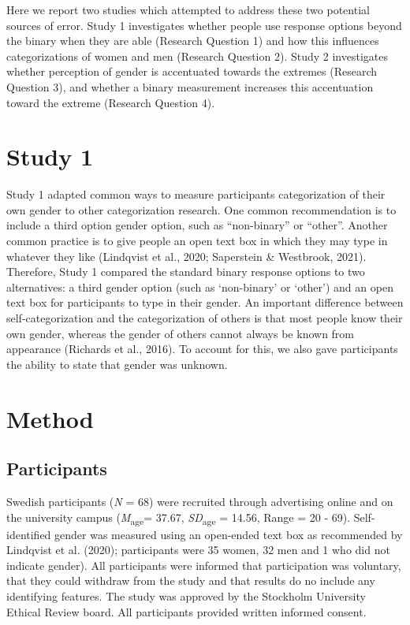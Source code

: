 \documentclass[
  man]{apa7}
\begin{document}
Here we report two studies which attempted to address these two potential sources of error. Study 1 investigates whether people use response options beyond the binary when they are able (Research Question 1) and how this influences categorizations of women and men (Research Question 2). Study 2 investigates whether perception of gender is accentuated towards the extremes (Research Question 3), and whether a binary measurement increases this accentuation toward the extreme (Research Question 4).

\hypertarget{study-1}{%
\section{Study 1}\label{study-1}}

Study 1 adapted common ways to measure participants categorization of their own gender to other categorization research. One common recommendation is to include a third option gender option, such as ``non-binary'' or ``other''. Another common practice is to give people an open text box in which they may type in whatever they like (Lindqvist et al., 2020; Saperstein \& Westbrook, 2021). Therefore, Study 1 compared the standard binary response options to two alternatives: a third gender option (such as `non-binary' or `other') and an open text box for participants to type in their gender. An important difference between self-categorization and the categorization of others is that most people know their own gender, whereas the gender of others cannot always be known from appearance (Richards et al., 2016). To account for this, we also gave participants the ability to state that gender was unknown.

\hypertarget{method}{%
\section{Method}\label{method}}

\hypertarget{participants}{%
\subsection{Participants}\label{participants}}

Swedish participants (\emph{N} = 68) were recruited through advertising online and on the university campus (\emph{M}\textsubscript{age}= 37.67, \emph{SD}\textsubscript{age} = 14.56, Range = 20 - 69). Self-identified gender was measured using an open-ended text box as recommended by Lindqvist et al. (2020); participants were 35 women, 32 men and 1 who did not indicate gender). All participants were informed that participation was voluntary, that they could withdraw from the study and that results do no include any identifying features. The study was approved by the Stockholm University Ethical Review board. All participants provided written informed consent.
\end{document}

